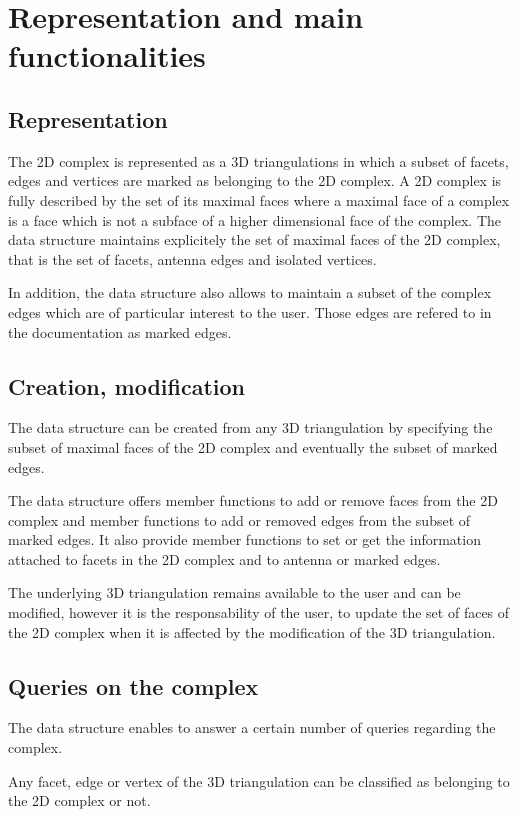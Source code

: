\section{Representation  and main functionalities}
\label{section_C2inT3_Functionalities}

\subsection{Representation}
The 2D complex is represented as a 3D triangulations in which
a subset of facets, edges and vertices are marked as belonging to the 
2D complex.  
A 2D complex is fully described by the set of its maximal faces
where a maximal face of a complex is a face which is not
a subface of a higher dimensional face of the complex.
The data structure maintains explicitely the set of maximal faces 
of the 2D complex, that is 
the set of facets, antenna edges and isolated vertices.

In addition, the data structure also allows to maintain a subset
of the complex edges which are of particular interest to the user.
Those edges are refered to in the documentation as marked
edges.

\subsection{Creation, modification}
The data structure can be created from any 3D triangulation
by specifying the subset of maximal faces of the 2D complex
and eventually the subset of marked edges.

The data structure offers member functions to add or remove faces from the
2D complex and member functions  to add or removed edges
from the subset of marked edges. It also provide member functions
to set or get the information attached to facets in the 2D complex
and  to antenna or  marked edges.

The underlying 3D triangulation remains  available to the user
and can be modified,  however it is the responsability
of the user, to update the set of faces of the 2D complex
when  it is affected by  the modification of the 3D triangulation.


\subsection{Queries on the complex}
The data structure enables to answer  a certain number of queries
regarding the complex.

Any facet, edge or vertex  of the  3D triangulation 
can be classified as belonging to the 2D complex or not.

